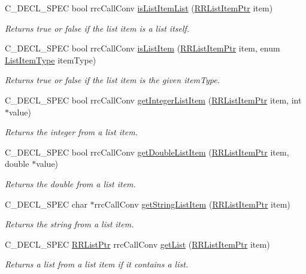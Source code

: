 \begin{DoxyCompactItemize}
C\+\_\+\+D\+E\+C\+L\+\_\+\+S\+P\+E\+C bool rrc\+Call\+Conv \hyperlink{group__list_gab4063382394faabc2d664ba2e11cb784}{is\+List\+Item\+List} (\hyperlink{rrc__types_8h_a79938364b69256c42480bb3a29ebf73e}{R\+R\+List\+Item\+Ptr} item)
\begin{DoxyCompactList}\small\item\em Returns true or false if the list item is a list itself. \end{DoxyCompactList}\item 
C\+\_\+\+D\+E\+C\+L\+\_\+\+S\+P\+E\+C bool rrc\+Call\+Conv \hyperlink{group__list_gaaefe3841ee62383e81de8b7cb12f3468}{is\+List\+Item} (\hyperlink{rrc__types_8h_a79938364b69256c42480bb3a29ebf73e}{R\+R\+List\+Item\+Ptr} item, enum \hyperlink{rrc__types_8h_ab99437ab2e88aa90b7ebb8add042b25e}{List\+Item\+Type} item\+Type)
\begin{DoxyCompactList}\small\item\em Returns true or false if the list item is the given item\+Type. \end{DoxyCompactList}\item 
C\+\_\+\+D\+E\+C\+L\+\_\+\+S\+P\+E\+C bool rrc\+Call\+Conv \hyperlink{group__list_gad99586f90455ec84208346fd023ad859}{get\+Integer\+List\+Item} (\hyperlink{rrc__types_8h_a79938364b69256c42480bb3a29ebf73e}{R\+R\+List\+Item\+Ptr} item, int $\ast$value)
\begin{DoxyCompactList}\small\item\em Returns the integer from a list item. \end{DoxyCompactList}\item 
C\+\_\+\+D\+E\+C\+L\+\_\+\+S\+P\+E\+C bool rrc\+Call\+Conv \hyperlink{group__list_gae8ee2b3a8aa50901408415a90da0439c}{get\+Double\+List\+Item} (\hyperlink{rrc__types_8h_a79938364b69256c42480bb3a29ebf73e}{R\+R\+List\+Item\+Ptr} item, double $\ast$value)
\begin{DoxyCompactList}\small\item\em Returns the double from a list item. \end{DoxyCompactList}\item 
C\+\_\+\+D\+E\+C\+L\+\_\+\+S\+P\+E\+C char $\ast$rrc\+Call\+Conv \hyperlink{group__list_ga177fc925d1726b0844c17837d3ed4425}{get\+String\+List\+Item} (\hyperlink{rrc__types_8h_a79938364b69256c42480bb3a29ebf73e}{R\+R\+List\+Item\+Ptr} item)
\begin{DoxyCompactList}\small\item\em Returns the string from a list item. \end{DoxyCompactList}\item 
C\+\_\+\+D\+E\+C\+L\+\_\+\+S\+P\+E\+C \hyperlink{rrc__types_8h_a32a8a60ac06858ff3a791672bd2bec73}{R\+R\+List\+Ptr} rrc\+Call\+Conv \hyperlink{group__list_gaf9b1219b9a239f0fb73cd83095bbecce}{get\+List} (\hyperlink{rrc__types_8h_a79938364b69256c42480bb3a29ebf73e}{R\+R\+List\+Item\+Ptr} item)
\begin{DoxyCompactList}\small\item\em Returns a list from a list item if it contains a list. \end{DoxyCompactList}\end{DoxyCompactItemize}


